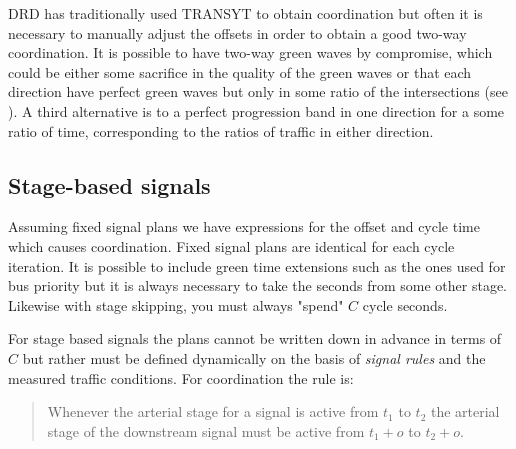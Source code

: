 DRD has traditionally used TRANSYT to obtain coordination but often it is necessary to manually adjust the offsets in order to obtain a good two-way coordination. It is possible to have two-way green waves by compromise, which could be either some sacrifice in the quality of the green waves or that each direction have perfect green waves but only in some ratio of the intersections (see \cite{artc}). A third alternative is to a perfect progression band in one direction for a some ratio of time, corresponding to the ratios of traffic in either direction.

\subsection{Stage-based signals}

Assuming fixed signal plans we have expressions for the offset and cycle time which causes coordination. Fixed signal plans are identical for each cycle iteration. It is possible to include green time extensions such as the ones used for bus priority but it is always necessary to take the seconds from some other stage. Likewise with stage skipping, you must always "spend" $C$ cycle seconds.

For stage based signals the plans cannot be written down in advance in terms of $C$ but rather must be defined dynamically on the basis of \textit{signal rules} and the measured traffic conditions. For coordination the rule is:

\begin{quote}
Whenever the arterial stage for a signal is active from $t_1$ to $t_2$ the arterial stage of the downstream signal must be active from $t_1 + o$ to $t_2 + o$.
\end{quote}

